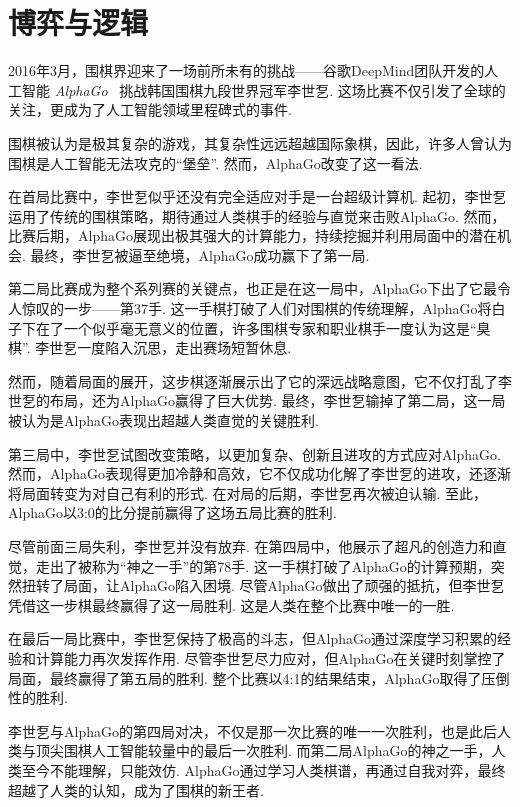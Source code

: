 \chapter{博弈与逻辑}\label{chap:game}

2016年3月，围棋界迎来了一场前所未有的挑战——谷歌DeepMind团队开发的人工智能 \textit{AlphaGo}~\cite{silverMasteringGameGo2016} 挑战韩国围棋九段世界冠军李世乭. 这场比赛不仅引发了全球的关注，更成为了人工智能领域里程碑式的事件. 

围棋被认为是极其复杂的游戏，其复杂性远远超越国际象棋，因此，许多人曾认为围棋是人工智能无法攻克的“堡垒”. 然而，AlphaGo改变了这一看法. 

在首局比赛中，李世乭似乎还没有完全适应对手是一台超级计算机. 起初，李世乭运用了传统的围棋策略，期待通过人类棋手的经验与直觉来击败AlphaGo. 然而，比赛后期，AlphaGo展现出极其强大的计算能力，持续挖掘并利用局面中的潜在机会. 最终，李世乭被逼至绝境，AlphaGo成功赢下了第一局. 

第二局比赛成为整个系列赛的关键点，也正是在这一局中，AlphaGo下出了它最令人惊叹的一步——第37手. 这一手棋打破了人们对围棋的传统理解，AlphaGo将白子下在了一个似乎毫无意义的位置，许多围棋专家和职业棋手一度认为这是“臭棋”. 李世乭一度陷入沉思，走出赛场短暂休息. 

然而，随着局面的展开，这步棋逐渐展示出了它的深远战略意图，它不仅打乱了李世乭的布局，还为AlphaGo赢得了巨大优势. 最终，李世乭输掉了第二局，这一局被认为是AlphaGo表现出超越人类直觉的关键胜利. 

第三局中，李世乭试图改变策略，以更加复杂、创新且进攻的方式应对AlphaGo. 然而，AlphaGo表现得更加冷静和高效，它不仅成功化解了李世乭的进攻，还逐渐将局面转变为对自己有利的形式. 在对局的后期，李世乭再次被迫认输. 至此，AlphaGo以3:0的比分提前赢得了这场五局比赛的胜利. 

尽管前面三局失利，李世乭并没有放弃. 在第四局中，他展示了超凡的创造力和直觉，走出了被称为“神之一手”的第78手. 这一手棋打破了AlphaGo的计算预期，突然扭转了局面，让AlphaGo陷入困境. 尽管AlphaGo做出了顽强的抵抗，但李世乭凭借这一步棋最终赢得了这一局胜利. 这是人类在整个比赛中唯一的一胜. 

在最后一局比赛中，李世乭保持了极高的斗志，但AlphaGo通过深度学习积累的经验和计算能力再次发挥作用. 尽管李世乭尽力应对，但AlphaGo在关键时刻掌控了局面，最终赢得了第五局的胜利. 整个比赛以4:1的结果结束，AlphaGo取得了压倒性的胜利. 

李世乭与AlphaGo的第四局对决，不仅是那一次比赛的唯一一次胜利，也是此后人类与顶尖围棋人工智能较量中的最后一次胜利. 而第二局AlphaGo的神之一手，人类至今不能理解，只能效仿. AlphaGo通过学习人类棋谱，再通过自我对弈，最终超越了人类的认知，成为了围棋的新王者. 

